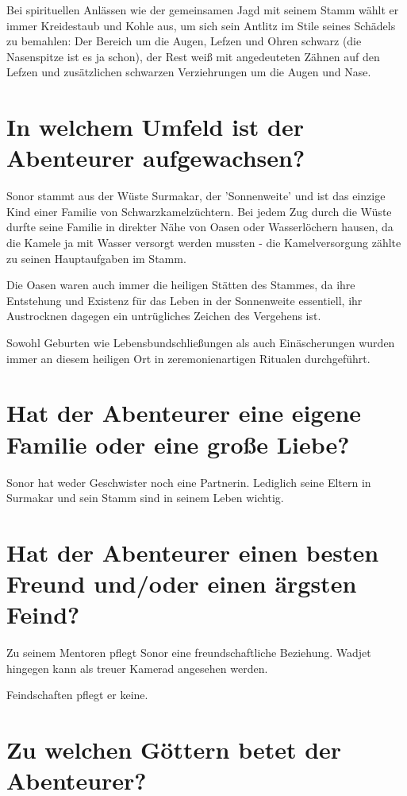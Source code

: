 \documentclass{article}
\begin{document}
	Bei spirituellen Anlässen wie der gemeinsamen Jagd mit seinem Stamm
	wählt er immer Kreidestaub und Kohle aus, um sich sein Antlitz im Stile
	seines Schädels zu bemahlen: Der Bereich um die Augen, Lefzen und Ohren schwarz
	(die Nasenspitze ist es ja schon), der Rest weiß mit angedeuteten Zähnen
	auf den Lefzen und zusätzlichen schwarzen Verziehrungen um die Augen und
	Nase.
	
	\section[Soziales Umfeld]{In welchem Umfeld ist der Abenteurer aufgewachsen?}
	
	Sonor stammt aus der Wüste Surmakar, der 'Sonnenweite' und ist das
	einzige Kind einer Familie von Schwarzkamelzüchtern. Bei jedem Zug durch
	die Wüste durfte seine Familie in direkter Nähe von Oasen oder
	Wasserlöchern hausen, da die Kamele ja mit Wasser versorgt werden
	mussten - die Kamelversorgung zählte zu seinen Hauptaufgaben im Stamm.

	Die Oasen waren auch immer die heiligen Stätten des Stammes, da ihre
	Entstehung und Existenz für das Leben in der Sonnenweite essentiell,
	ihr Austrocknen dagegen ein untrügliches Zeichen des Vergehens ist.
	
	Sowohl Geburten wie Lebensbundschließungen als auch Einäscherungen wurden immer
	an diesem heiligen Ort in zeremonienartigen Ritualen durchgeführt.


	\section[Beziehungsstatus]{Hat der Abenteurer eine eigene Familie oder eine große Liebe?}

	Sonor hat weder Geschwister noch eine Partnerin. Lediglich seine Eltern
	in Surmakar und sein Stamm sind in seinem Leben wichtig.


	\section[Freund und Feind]{Hat der Abenteurer einen besten Freund und/oder einen ärgsten Feind?}

	Zu seinem Mentoren pflegt Sonor eine freundschaftliche Beziehung.
	Wadjet hingegen kann als treuer Kamerad angesehen werden.
	
	Feindschaften pflegt er keine. 


	\section[Religion]{Zu welchen Göttern betet der Abenteurer?}
	
\end{document}
